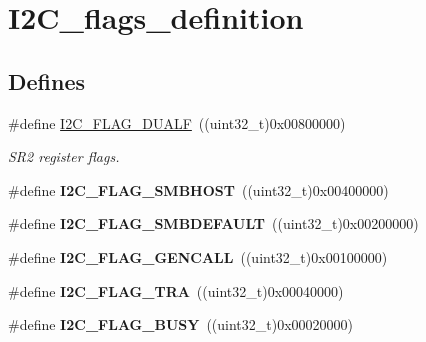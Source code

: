 \hypertarget{group__I2C__flags__definition}{
\section{I2C\_\-flags\_\-definition}
\label{group__I2C__flags__definition}
}
\subsection*{Defines}
\begin{DoxyCompactItemize}
\item 
\hypertarget{group__I2C__flags__definition_ga3755b783aa73568659478c2e2e45e27f}{
\#define \hyperlink{group__I2C__flags__definition_ga3755b783aa73568659478c2e2e45e27f}{I2C\_\-FLAG\_\-DUALF}~((uint32\_\-t)0x00800000)}
\label{group__I2C__flags__definition_ga3755b783aa73568659478c2e2e45e27f}

\begin{DoxyCompactList}\small\item\em SR2 register flags. \item\end{DoxyCompactList}\item 
\hypertarget{group__I2C__flags__definition_gaf15403a1852f39aaadbb8942ba98d97e}{
\#define {\bfseries I2C\_\-FLAG\_\-SMBHOST}~((uint32\_\-t)0x00400000)}
\label{group__I2C__flags__definition_gaf15403a1852f39aaadbb8942ba98d97e}

\item 
\hypertarget{group__I2C__flags__definition_ga371fb29861d1cd41736253e804c67ad5}{
\#define {\bfseries I2C\_\-FLAG\_\-SMBDEFAULT}~((uint32\_\-t)0x00200000)}
\label{group__I2C__flags__definition_ga371fb29861d1cd41736253e804c67ad5}

\item 
\hypertarget{group__I2C__flags__definition_gab3a93b6840ad406c2fc09e0e96c59b88}{
\#define {\bfseries I2C\_\-FLAG\_\-GENCALL}~((uint32\_\-t)0x00100000)}
\label{group__I2C__flags__definition_gab3a93b6840ad406c2fc09e0e96c59b88}

\item 
\hypertarget{group__I2C__flags__definition_ga0359a5f960670d51cb17e659d32498ea}{
\#define {\bfseries I2C\_\-FLAG\_\-TRA}~((uint32\_\-t)0x00040000)}
\label{group__I2C__flags__definition_ga0359a5f960670d51cb17e659d32498ea}

\item 
\hypertarget{group__I2C__flags__definition_ga50f69f043d99600221076100823b6ff3}{
\#define {\bfseries I2C\_\-FLAG\_\-BUSY}~((uint32\_\-t)0x00020000)}
\label{group__I2C__flags__definition_ga50f69f043d99600221076100823b6ff3}


\end{DoxyCompactItemize}
